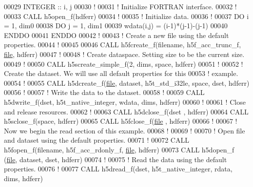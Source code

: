 \begin{DoxyCode}
00029   \textcolor{keywordtype}{INTEGER} :: i, j
00030   \textcolor{comment}{!}
00031   \textcolor{comment}{! Initialize FORTRAN interface.}
00032   \textcolor{comment}{!}
00033   \textcolor{keyword}{CALL }h5open\_f(hdferr)
00034   \textcolor{comment}{!}
00035   \textcolor{comment}{! Initialize data.}
00036   \textcolor{comment}{!}
00037   \textcolor{keywordflow}{DO} i = 1, dim0
00038      \textcolor{keywordflow}{DO} j = 1, dim1
00039         wdata(i,j) = (i-1)*(j-1)-(j-1)
00040 \textcolor{keywordflow}{     ENDDO}
00041 \textcolor{keywordflow}{  ENDDO}
00042   \textcolor{comment}{!}
00043   \textcolor{comment}{! Create a new file using the default properties.}
00044   \textcolor{comment}{!}
00045   
00046   \textcolor{keyword}{CALL }h5fcreate\_f(filename, h5f\_acc\_trunc\_f, \hyperlink{structfile}{file}, hdferr)
00047   \textcolor{comment}{!}
00048   \textcolor{comment}{! Create dataspace.  Setting size to be the current size.}
00049   \textcolor{comment}{!}
00050   \textcolor{keyword}{CALL }h5screate\_simple\_f(2, dims, space, hdferr)
00051   \textcolor{comment}{!}
00052   \textcolor{comment}{! Create the dataset.  We will use all default properties for this}
00053   \textcolor{comment}{! example.}
00054   \textcolor{comment}{!}
00055   \textcolor{keyword}{CALL }h5dcreate\_f(\hyperlink{structfile}{file}, dataset, h5t\_std\_i32le, space, dset, hdferr)
00056   \textcolor{comment}{!}
00057   \textcolor{comment}{! Write the data to the dataset.}
00058   \textcolor{comment}{!}
00059   \textcolor{keyword}{CALL }h5dwrite\_f(dset, h5t\_native\_integer, wdata, dims, hdferr)
00060   \textcolor{comment}{!}
00061   \textcolor{comment}{! Close and release resources.}
00062   \textcolor{comment}{!}
00063   \textcolor{keyword}{CALL }h5dclose\_f(dset , hdferr)
00064   \textcolor{keyword}{CALL }h5sclose\_f(space, hdferr)
00065   \textcolor{keyword}{CALL }h5fclose\_f(\hyperlink{structfile}{file} , hdferr)
00066   \textcolor{comment}{!}
00067   \textcolor{comment}{! Now we begin the read section of this example.}
00068   \textcolor{comment}{!}
00069   \textcolor{comment}{!}
00070   \textcolor{comment}{! Open file and dataset using the default properties.}
00071   \textcolor{comment}{!}
00072   \textcolor{keyword}{CALL }h5fopen\_f(filename, h5f\_acc\_rdonly\_f, \hyperlink{structfile}{file}, hdferr)
00073   \textcolor{keyword}{CALL }h5dopen\_f (\hyperlink{structfile}{file}, dataset, dset, hdferr)
00074   \textcolor{comment}{!}
00075   \textcolor{comment}{! Read the data using the default properties.}
00076   \textcolor{comment}{!}
00077   \textcolor{keyword}{CALL }h5dread\_f(dset, h5t\_native\_integer, rdata, dims, hdferr)

\end{DoxyCode}

